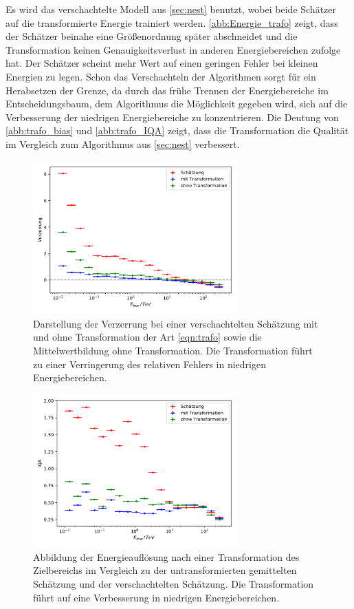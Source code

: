 Es wird das verschachtelte Modell aus \autoref{sec:nest} benutzt, wobei beide Schätzer auf die transformierte Energie trainiert werden.
\autoref{abb:Energie_trafo} zeigt, dass der Schätzer beinahe eine Größenordnung später abschneidet und die Transformation keinen Genauigkeitsverlust
in anderen Energiebereichen zufolge hat.
Der Schätzer scheint mehr Wert auf einen geringen Fehler bei kleinen Energien zu legen.
Schon das Verschachteln der Algorithmen sorgt für ein Herabsetzen der Grenze, da durch das frühe Trennen der Energiebereiche im Entscheidungsbaum, dem
Algorithmus die Möglichkeit gegeben wird, sich auf die Verbesserung der niedrigen Energiebereiche zu konzentrieren.
Die Deutung von \autoref{abb:trafo_bias} und \autoref{abb:trafo_IQA} zeigt, dass die Transformation die Qualität im Vergleich
zum Algorithmus aus \ref{sec:nest} verbessert.
\begin{figure}
  \includegraphics[width=0.7\textwidth]{Plots/trafo_nested_bias.pdf}
  \centering
  \caption{Darstellung der Verzerrung bei einer verschachtelten Schätzung mit und ohne Transformation der Art \eqref{eqn:trafo} sowie die Mittelwertbildung ohne Transformation. Die Transformation führt zu einer Verringerung
          des relativen Fehlers in niedrigen Energiebereichen.}
  \label{abb:trafo_bias}
\end{figure}
\begin{figure}
  \includegraphics[width=0.7\textwidth]{Plots/trafo_nested_resolution.pdf}
  \centering
  \caption{Abbildung der Energieauflösung nach einer Transformation des Zielbereichs im Vergleich zu der untransformierten gemittelten Schätzung und der verschachtelten Schätzung. Die Transformation führt auf eine
          Verbesserung in niedrigen Energiebereichen.}
  \label{abb:trafo_IQA}
\end{figure}
